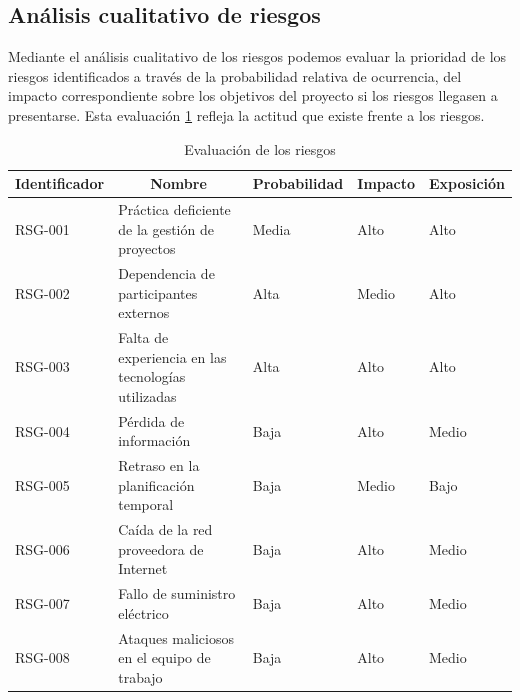 \subsection{Análisis cualitativo de riesgos}
Mediante el análisis cualitativo de los riesgos podemos evaluar la prioridad de los riesgos identificados a través de la probabilidad relativa de ocurrencia, del impacto correspondiente sobre los objetivos del proyecto si los riesgos llegasen a presentarse. Esta evaluación \ref{tab_eval_riesgos} refleja la actitud que existe frente a los riesgos. 

\begin{table}[htpb]
\centering
\begin{tabularx}{\textwidth}{|l|X|l|l|l|}
\hline
\multicolumn{1}{|c|}{Identificador} & \multicolumn{1}{c|}{Nombre}                        & \multicolumn{1}{c|}{Probabilidad} & \multicolumn{1}{c|}{Impacto} & \multicolumn{1}{c|}{Exposición} \\ \hline
RSG-001                             & Práctica deficiente de la gestión de proyectos     & Media                             & Alto                         & Alto                            \\ \hline
RSG-002                             & Dependencia de participantes externos              & Alta                              & Medio                        & Alto                            \\ \hline
RSG-003                             & Falta de experiencia en las tecnologías utilizadas & Alta                              & Alto                         & Alto                            \\ \hline
RSG-004                             & Pérdida de información                             & Baja                              & Alto                         & Medio                           \\ \hline
RSG-005                             & Retraso en la planificación temporal               & Baja                              & Medio                        & Bajo                            \\ \hline
RSG-006                             & Caída de la red proveedora de Internet             & Baja                              & Alto                         & Medio                           \\ \hline
RSG-007                             & Fallo de suministro eléctrico                      & Baja                              & Alto                         & Medio                           \\ \hline
RSG-008                             & Ataques maliciosos en el equipo de trabajo         & Baja                              & Alto                         & Medio                           \\ \hline
\end{tabularx}
\caption{Evaluación de los riesgos}
\label{tab_eval_riesgos}
\end{table}

